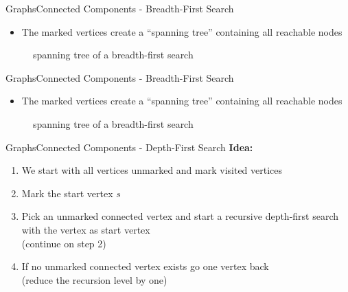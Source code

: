 
\begin{frame}{Graphs}{Connected Components - Breadth-First Search}
  \begin{itemize}
    \item
      The marked vertices create a \enquote{spanning tree} containing all
      reachable nodes
  \end{itemize}
  \begin{figure}
    \begin{adjustbox}{width=0.95\linewidth}
      
    \end{adjustbox}
    \caption{spanning tree of a breadth-first search}
  \end{figure}
\end{frame}


\begin{frame}{Graphs}{Connected Components - Breadth-First Search}
  \begin{itemize}
    \item
      The marked vertices create a \enquote{spanning tree} containing all
      reachable nodes
  \end{itemize}
  \begin{figure}
    \begin{adjustbox}{width=0.95\linewidth}
      
    \end{adjustbox}
    \caption{spanning tree of a breadth-first search}
  \end{figure}
\end{frame}


\begin{frame}{Graphs}{Connected Components - Depth-First Search}
  \textbf{Idea:}
  \begin{enumerate}
    \item<2->
      We start with all vertices unmarked and
      {\color{Mittel-Blau}mark visited vertices}
    \item<3->
      Mark the start vertex {\color{Mittel-Blau}$s$}
    \item<4->
      Pick an unmarked {\color{Mittel-Blau}connected vertex} and start a
      {\color{Mittel-Blau}recursive depth-first search} with the vertex as
      start vertex\\
      (continue on step 2)
    \item<5->
      If no unmarked connected vertex exists go one vertex back\\
      (reduce the recursion level by one)
  \end{enumerate}
\end{frame}


